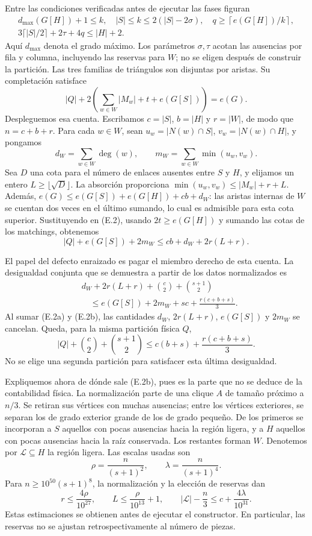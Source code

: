 \documentclass[spanish,11pt,a4paper]{article}
\begin{document}
Entre las condiciones verificadas antes de ejecutar las fases figuran \[
\begin{gathered}
d_{\max}(G[H])+1\le k,\quad |S|\le k\le2(|S|-2\sigma),\quad
q\ge\left\lceil e(G[H])/k\right\rceil,\\
3\lceil|S|/2\rceil+2\tau+4q\le |H|+2.
\end{gathered}
\tag{E.1}
\] Aquí \(d_{\max}\) denota el grado máximo. Los parámetros \(\sigma,\tau\) acotan las ausencias por fila y columna, incluyendo las reservas para \(W\); no se eligen después de construir la partición. Las tres familias de triángulos son disjuntas por aristas. Su completación satisface \[
|Q|+2\left(\sum_{w\in W}|M_w|+t+e(G[S])\right)=e(G).
\tag{E.2}
\] Despleguemos esa cuenta. Escribamos \(c=|S|\), \(b=|H|\) y \(r=|W|\), de modo que \(n=c+b+r\). Para cada \(w\in W\), sean \(u_w=|N(w)\cap S|\), \(v_w=|N(w)\cap H|\), y pongamos \[
d_W=\sum_{w\in W}\deg(w),\qquad
m_W=\sum_{w\in W}\min(u_w,v_w).
\] Sea \(D\) una cota para el número de enlaces ausentes entre \(S\) y \(H\), y elijamos un entero \(L\ge\lfloor\sqrt D\rfloor\). La absorción proporciona \(\min(u_w,v_w)\le |M_w|+r+L\). Además, \(e(G)\le e(G[S])+e(G[H])+cb+d_W\): las aristas internas de \(W\) se cuentan dos veces en el último sumando, lo cual es admisible para esta cota superior. Sustituyendo en (E.2), usando \(2t\ge e(G[H])\) y sumando las cotas de los matchings, obtenemos \[
|Q|+e(G[S])+2m_W\le cb+d_W+2r(L+r).
\tag{E.2a}
\]

El papel del defecto enraizado es pagar el miembro derecho de esta cuenta. La desigualdad conjunta que se demuestra a partir de los datos normalizados es \[
\begin{split}
&d_W+2r(L+r)+\binom c2+\binom{s+1}2\\
&\hspace{1em}\le e(G[S])+2m_W+sc+\frac{r(c+b+s)}3.
\end{split}
\tag{E.2b}
\] Al sumar (E.2a) y (E.2b), las cantidades \(d_W\), \(2r(L+r)\), \(e(G[S])\) y \(2m_W\) se cancelan. Queda, para la misma partición física \(Q\), \[
|Q|+\binom c2+\binom{s+1}2
\le c(b+s)+\frac{r(c+b+s)}3.
\tag{E.2c}
\] No se elige una segunda partición para satisfacer esta última desigualdad.

Expliquemos ahora de dónde sale (E.2b), pues es la parte que no se deduce de la contabilidad física. La normalización parte de una clique \(A\) de tamaño próximo a \(n/3\). Se retiran sus vértices con muchas ausencias; entre los vértices exteriores, se separan los de grado exterior grande de los de grado pequeño. De los primeros se incorporan a \(S\) aquellos con pocas ausencias hacia la región ligera, y a \(H\) aquellos con pocas ausencias hacia la raíz conservada. Los restantes forman \(W\). Denotemos por \(\mathcal L\subseteq H\) la región ligera. Las escalas usadas son \[
\rho=\frac{n}{(s+1)^2},\qquad \lambda=\frac{n}{(s+1)^4}.
\] Para \(n\ge10^{50}(s+1)^8\), la normalización y la elección de reservas dan \[
r\le\frac{4\rho}{10^{27}},\qquad
L\le\frac{\rho}{10^{13}}+1,\qquad
|\mathcal L|-\frac n3\le c+\frac{4\lambda}{10^{31}}.
\] Estas estimaciones se obtienen antes de ejecutar el constructor. En particular, las reservas no se ajustan retrospectivamente al número de piezas.
\end{document}
